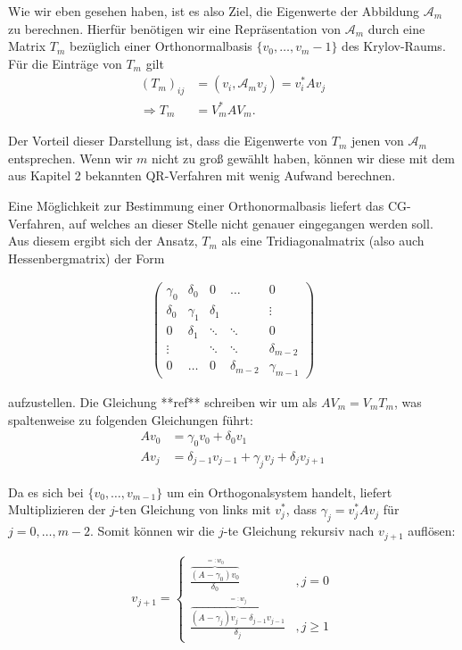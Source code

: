 \documentclass{article}
\begin{document}
Wie wir eben gesehen haben, ist es also Ziel, die Eigenwerte der Abbildung $\mathcal{A}_m$ zu berechnen. Hierfür benötigen wir eine Repräsentation von $\mathcal{A}_m$ durch eine Matrix $T_m$ bezüglich einer Orthonormalbasis $\{v_0, \dots, v_m-1\}$ des Krylov-Raums. Für die Einträge von $T_m$ gilt
\begin{align*}
	(T_m)_{ij} &= (v_i, \mathcal{A}_m v_j) = v_i^*Av_j \\
	\Rightarrow T_m &= V_m^*AV_m.
\end{align*}

Der Vorteil dieser Darstellung ist, dass die Eigenwerte von $T_m$ jenen von $\mathcal{A}_m$ entsprechen. Wenn wir $m$ nicht zu groß gewählt haben, können wir diese mit dem aus Kapitel 2 bekannten QR-Verfahren mit wenig Aufwand berechnen.

Eine Möglichkeit zur Bestimmung einer Orthonormalbasis liefert das CG-Verfahren, auf welches an dieser Stelle nicht genauer eingegangen werden soll. Aus diesem ergibt sich der Ansatz, $T_m$ als eine Tridiagonalmatrix (also auch Hessenbergmatrix) der Form

\begin{align}\label{trimatrix}
\begin{pmatrix}
	\gamma_0 & \delta_0 & 0 & \hdots & 0 \\
	\delta_0 & \gamma_1 & \delta_1 &  & \vdots \\
	0 & \delta_1 & \ddots & \ddots & 0 \\
	\vdots &  & \ddots & \ddots & \delta_{m-2} \\
	0 & \hdots & 0 & \delta_{m-2} & \gamma_{m-1}
\end{pmatrix}
\end{align}

aufzustellen. Die Gleichung **ref** schreiben wir um als $AV_m = V_m T_m$, was spaltenweise zu folgenden Gleichungen führt:
\begin{align*}
	A v_0 &= \gamma_0 v_0 + \delta_0 v_1 \\
	A v_j &= \delta_{j-1} v_{j-1} + \gamma_j v_j + \delta_j v_{j+1}
\end{align*}

Da es sich bei $\{v_0, \dots, v_{m-1}\}$ um ein Orthogonalsystem handelt, liefert Multiplizieren der $j$-ten Gleichung von links mit $v_j^*$, dass $\gamma_j = v_j^*Av_j$ für $j = 0, \dots, m-2$. Somit können wir die $j$-te Gleichung rekursiv nach $v_{j+1}$ auflösen:

\begin{align*}
	v_{j+1} = \begin{cases}
		\frac{\overbrace{(A-\gamma_0)v_0}^{=:w_0}}{\delta_0} &,j = 0 \\
		\frac{\overbrace{(A-\gamma_j)v_j - \delta_{j-1} v_{j-1}}^{=:w_j}}{\delta_j} &,j \geq 1
	\end{cases}
\end{align*}
\end{document}

